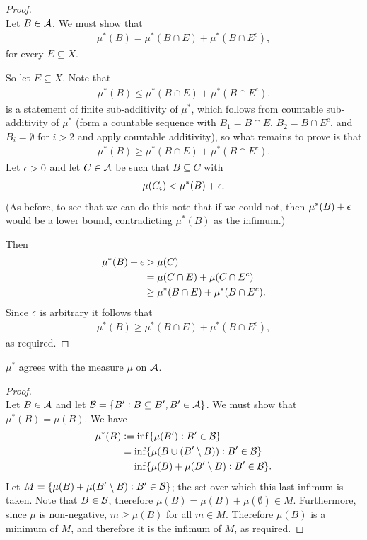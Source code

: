 \begin{proof}~\\
  Let $B \in \mathcal A$. We must show that
  \begin{align*}
    \mu^*(B) = \mu^*(B \cap E) + \mu^*(B \cap E^c),
  \end{align*}
  for every $E \subseteq X$.

  So let $E \subseteq X$. Note that
  \begin{align*}
    \mu^*(B) \leq \mu^*(B \cap E) + \mu^*(B \cap E^c).
  \end{align*}
  is a statement of finite sub-additivity of $\mu^*$, which follows from countable sub-additivity of $\mu^*$
  (form a countable sequence with $B_1 = B \cap E$, $B_2 = B \cap E^c$, and $B_i = \emptyset$ for $i > 2$ and
  apply countable additivity), so what remains to prove is that
  \begin{align*}
    \mu^*(B) \geq \mu^*(B \cap E) + \mu^*(B \cap E^c).
  \end{align*}
  Let $\epsilon > 0$ and let $C \in \mathcal A$ be such that $B \subseteq C$ with
  \begin{align*}
    \mu(C_i) < \mu^*(B) + \epsilon.
  \end{align*}
  (As before, to see that we can do this note that if we could not, then $\mu^*(B) + \epsilon$ would be a lower
  bound, contradicting $\mu^*(B)$ as the infimum.)

  Then
  \begin{align*}
    \mu^*(B) + \epsilon
    &> \mu(C) \\
    &= \mu(C \cap E) + \mu(C \cap E^c) \\
    &\geq \mu^*(B \cap E) + \mu^*(B \cap E^c).
  \end{align*}
  Since $\epsilon$ is arbitrary it follows that
  \begin{align*}
    \mu^*(B) \geq \mu^*(B \cap E) + \mu^*(B \cap E^c),
  \end{align*}
  as required.
\end{proof}


\begin{claim*}
  $\mu^*$ agrees with the measure $\mu$ on $\mathcal A$.
\end{claim*}

\begin{proof}~\\
  Let $B \in \mathcal A$ and let $\mathcal B = \{B' : B \subseteq B', B' \in \mathcal A\}$. We must show
  that $\mu^*(B) = \mu(B)$. We have
  \begin{align*}
    \mu^*(B)
    &:= \inf \{\mu(B') : B' \in \mc B\} \\
    &=  \inf \{\mu(B \cup (B' \setminus B)) : B' \in \mc B\} \\
    &=  \inf \{\mu(B) + \mu(B' \setminus B) : B' \in \mc B\}.
  \end{align*}
  Let $M = \{\mu(B) + \mu(B' \setminus B) : B' \in \mathcal B\}$; the set over which this last infimum is taken.
  Note that $B \in \mathcal B$, therefore $\mu(B) = \mu(B) + \mu(\emptyset) \in M$. Furthermore, since $\mu$ is
  non-negative, $m \geq \mu(B)$ for all $m \in M$. Therefore $\mu(B)$ is a minimum of $M$, and therefore it is
  the infimum of $M$, as required.
\end{proof}

